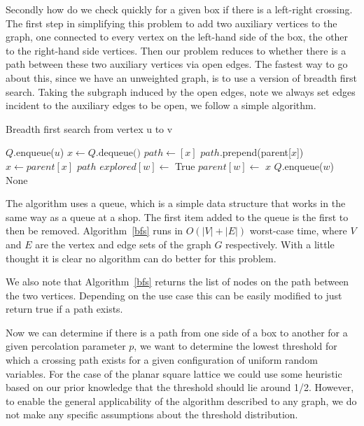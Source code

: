 \documentclass[a4paper,11pt]{article}
\theoremstyle{definition}
\begin{document}
Secondly how do we check quickly for a given box if there is a left-right crossing. The first step in simplifying this problem to add two auxiliary vertices to the graph, one connected to every vertex on the left-hand side of the box, the other to the right-hand side vertices. Then our problem reduces to whether there is a path between these two auxiliary vertices via open edges.
The fastest way to go about this, since we have an unweighted graph, is to use a version of breadth first search. Taking the subgraph induced by the open edges, note we always set edges incident to the auxiliary edges to be open, we follow a simple algorithm.
\begin{algorithm}
	\caption{Breadth first search from vertex u to v}\label{bfs}
	\begin{algorithmic}[1]
	\State $Q$.enqueue($u$)
		\State $x \gets Q\text{.dequeue()}$
		 
			\State $path \gets [x]$
				\State $path$.prepend(parent[$x$])
				\State $x \gets parent[x]$
			\EndWhile
			\State
			\Return $path$
		\EndIf
				\State $explored[w] \gets$ True
				\State $parent[w] \gets$ $x$
				\State $Q$.enqueue($w$)
			\EndIf
		\EndFor
	\EndWhile
	 \Return None
	\EndIf
	\EndProcedure
	\end{algorithmic}
	\end{algorithm}

The algorithm uses a queue, which is a simple data structure that works in the same way as a queue at a shop. The first item added to the queue is the first to then be removed.
Algorithm~\ref*{bfs} runs in $O(|V|+|E|)$ worst-case time, where $V$ and $E$ are the vertex and edge sets of the graph $G$ respectively. With a little thought it is clear no algorithm can do better for this problem. 

We also note that Algorithm~\ref*{bfs} returns the list of nodes on the path between the two vertices. Depending on the use case this can be easily modified to just return true if a path exists. 

Now we can determine if there is a path from one side of a box to another for a given percolation parameter $p$, we want to determine the lowest threshold for which a crossing path exists for a given configuration of uniform random variables. For the case of the planar square lattice we could use some heuristic based on our prior knowledge that the threshold should lie around 1/2. However, to enable the general applicability of the algorithm described to any graph, we do not make any specific assumptions about the threshold distribution.
\end{document}
